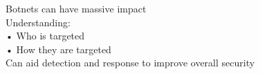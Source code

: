 \documentclass[preview]{standalone}
\begin{document}
Botnets can have massive impact\\Understanding:\\• Who is targeted\\• How they are targeted\\Can aid detection and response to improve overall security\\
\end{document}
